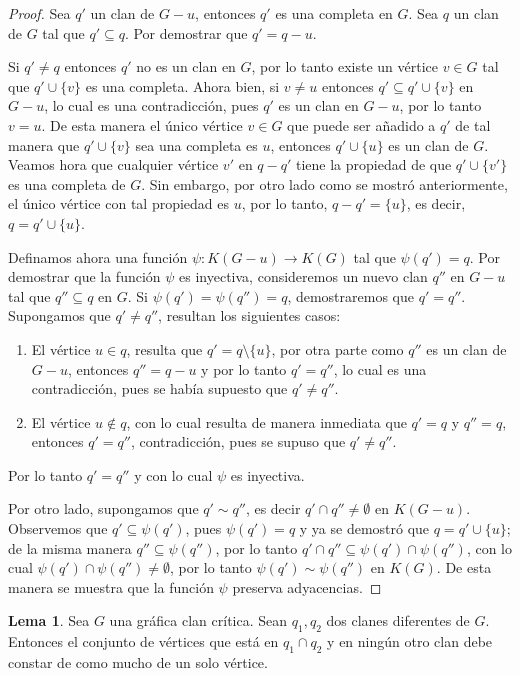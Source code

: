 \documentclass[12pt]{book}
\theoremstyle{definition}
\newtheorem{Lem}[theorem]{Lema}
\begin{document}
\begin{proof}
Sea $q'$ un clan de $G-u$, entonces $q'$ es una completa en $G$. Sea $q$ un clan de $G$ tal que $q'\subseteq q$. Por demostrar que $q'=q-u$.

Si $q'\neq q$ entonces $q'$ no es un clan en $G$, por lo tanto existe un vértice $v\in G$ tal que $q' \cup \{v\}$ es una completa. Ahora bien, si $v\neq u$ entonces $q'\subseteq q' \cup \{v\}$ en $G-u$, lo cual es una contradicción, pues $q'$ es un clan en $G-u$, por lo tanto $v=u$. De esta manera el único vértice $v\in G$ que puede ser añadido a $q'$ de tal manera que $q'\cup \{v\}$ sea una completa es $u$, entonces $q'\cup \{u\}$ es un clan de $G$.
Veamos hora que cualquier vértice $v'$ en $q-q'$ tiene la propiedad de que $q'\cup \{v'\}$ es una completa de $G$. Sin embargo, por otro lado como se mostró anteriormente, el único vértice con tal propiedad es $u$, por lo tanto, $q-q'=\{u\}$, es decir, $q=q'\cup\{u\}$.

Definamos ahora una función $\psi:K(G-u)\to K(G)$ tal que $\psi(q')=q$. Por demostrar que la función $\psi$ es inyectiva, consideremos un nuevo clan $q''$ en $G-u$ tal que $q''\subseteq q$ en $G$. Si $\psi(q')=\psi(q'')=q$, demostraremos que $q'=q''$. Supongamos que $q'\neq q''$, resultan los siguientes casos:
\begin{enumerate}
\item El vértice $u\in q$, resulta que $q'=q\setminus \{u\}$, por otra parte como $q''$ es un clan de $G-u$, entonces $q''=q-u$ y por lo tanto $q'=q''$, lo cual es una contradicción, pues se había supuesto que $q'\neq q''$.
\item El vértice $u \notin q$, con lo cual resulta de manera inmediata que $q'=q$ y $q''=q$, entonces $q'=q''$, contradicción, pues se supuso que $q'\neq q''$.
\end{enumerate}
Por lo tanto $q'=q''$ y con lo cual $\psi$ es inyectiva.

Por otro lado, supongamos que $q'\sim q''$, es decir $q'\cap q''\neq\emptyset$ en $K(G-u)$. Observemos que $q'\subseteq\psi(q')$, pues $\psi(q')=q$ y ya se demostró que $q=q'\cup\{u\}$; de la misma manera $q''\subseteq\psi(q'')$, por lo tanto $q'\cap q''\subseteq\psi(q')\cap\psi(q'')$, con lo cual $\psi(q')\cap\psi(q'')\neq\emptyset$, por lo tanto $\psi(q')\sim\psi(q'')$ en $K(G)$. De esta manera se muestra que la función $\psi$ preserva adyacencias.

\end{proof}

\begin{Lem}
Sea $G$ una gráfica clan crítica. Sean $q_1,q_2$ dos clanes diferentes de $G$. Entonces el conjunto de vértices que está en $q_1\cap q_2$ y en ningún otro clan debe constar de como mucho de un solo vértice.
\end{Lem}
\end{document}
